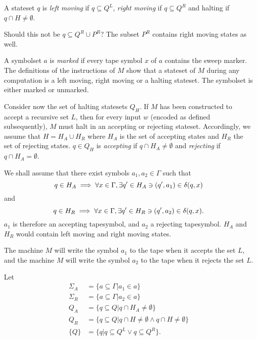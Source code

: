 A stateset $q$ is \emph{left moving} if $q \subseteq Q^L$, \emph{right moving} if
$q \subseteq Q^R$ and halting if $q \cap H \neq \emptyset$.
\begin{error}
    Should this not be $q \subseteq Q^R \cup P^R$?
    The subset $P^R$ contains right moving states as well.
\end{error}
A symbolset $a$ is \emph{marked} if every tape symbol $x$ of $a$ contains the sweep marker.
The definitions of the instructions of $M$ show that a stateset of $M$ during any
computation is a left moving, right moving or a halting stateset.
The symbolset is either marked or unmarked.

Consider now the set of halting statesets $Q_H$.
If $M$ has been constructed to accept a recursive set $L$, then
for every input $w$ (encoded as defined subsequently), $M$ must halt
in an accepting or rejecting stateset.
Accordingly, we assume that $H = H_A \cup H_R$ where
$H_A$ is the set of accepting states and $H_R$ the set of
rejecting states.
$q \in Q_H$ is \emph{accepting} if $q \cap H_A \neq \emptyset$
and \emph{rejecting} if $q \cap H_A = \emptyset$.

We shall assume that there exist symbols $a_1, a_2 \in \Gamma$ such that
\[
    q \in H_A \implies \forall x \in \Gamma, \exists q' \in H_A \ni
    (q', a_1) \in \delta(q,x)
\]
and
\[
    q \in H_R \implies \forall x \in \Gamma, \exists q' \in H_R \ni
    (q', a_2) \in \delta(q,x).
\]
$a_1$ is therefore an accepting tapesymbol, and $a_2$ a rejecting
tapesymbol.  $H_A$ and $H_R$ would contain left moving and right moving states.

\begin{aside}
    The machine $M$ will write the symbol $a_1$ to the tape when it accepts the set $L$, and
    the machine $M$ will write the symbol $a_2$ to the tape when it rejects the set $L$.
\end{aside}

Let
\begin{align*}
    \Sigma_{A} &= \{a \subseteq \Gamma | a_1 \in a\} \\
    \Sigma_{R} &= \{a \subseteq \Gamma | a_2 \in a\} \\
    Q_A &= \{q \subseteq Q | q \cap H_A \neq \emptyset\} \\
    Q_R &= \{q \subseteq Q | q \cap H \neq \emptyset \land q \cap H \neq \emptyset \} \\
    \{Q\} &= \{q | q \subseteq Q^L \lor q \subseteq Q^R \}.
\end{align*}

